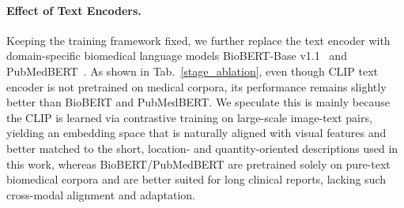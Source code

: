 \documentclass{article} %
\begin{document}
\begin{table}[htbp]
\caption{Ablation study on MosMedData+ and CVC-ClinicDB datasets.}
\label{stage_ablation}
\begin{center}
\end{center}
\end{table}

\paragraph{Effect of Text Encoders.}

Keeping the training framework fixed, we further replace the text encoder with domain-specific biomedical language models BioBERT-Base v1.1~\citep{lee2020biobert} and PubMedBERT~\citep{gu2021domain}. As shown in Tab.~\ref{stage_ablation}, even though CLIP text encoder is not pretrained on medical corpora, its performance remains slightly better than BioBERT and PubMedBERT. We speculate this is mainly because the CLIP is learned via contrastive training on large-scale image-text pairs, yielding an embedding space that is naturally aligned with visual features and better matched to the short, location- and quantity-oriented descriptions used in this work, whereas BioBERT/PubMedBERT are pretrained solely on pure-text biomedical corpora and are better suited for long clinical reports, lacking such cross-modal alignment and adaptation.
\end{document}
